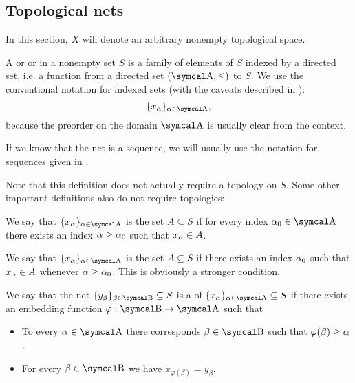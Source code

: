 \subsection{Topological nets}\label{subsec:topological_nets}

In this section, \( X \) will denote an arbitrary nonempty topological space.

\begin{definition}\label{def:topological_net}
  A  or  or  in a nonempty set \( S \) is a family of elements of \( S \) indexed by a directed set, i.e. a function from a directed set \( (\CA, \leq) \) to \( S \). We use the conventional notation for indexed sets (with the caveats described in ):
  \begin{equation*}
    \{ x_\al \}_{\al \in \CA},
  \end{equation*}
  because the preorder on the domain \( \CA \) is usually clear from the context.

  If we know that the net is a sequence, we will usually use the notation for sequences given in .

  Note that this definition does not actually require a topology on \( S \). Some other important definitions also do not require topologies:
  \begin{defenum}
     We say that \( \{ x_\al \}_{\al \in \CA} \) is  the set \( A \subseteq S \) if for every index \( \al_0 \in \CA \) there exists an index \( \alpha \geq \alpha_0 \) such that \( x_\alpha \in A \).

     We say that \( \{ x_\al \}_{\al \in \CA} \) is  the set \( A \subseteq S \) if there exists an index \( \alpha_0 \) such that \( x_\alpha \in A \) whenever \( \alpha \geq \alpha_0 \). This is obviously a stronger condition.

    \cite[50]{Engelking1989} We say that the net \( \{ y_\beta \}_{\beta \in \CB} \subseteq S \) is a  of \( \{ x_\al \}_{\al \in \CA} \subseteq S \) if there exists an embedding function \( \varphi: \CB \to \CA \) such that
    \begin{itemize}
      \item To every \( \al \in \CA \) there corresponds \( \beta \in \CB \) such that \( \varphi(\beta) \geq \alpha \).
      \item For every \( \beta \in \CB \) we have \( x_{\varphi(\beta)} = y_\beta \).
    \end{itemize}
  \end{defenum}
\end{definition}

